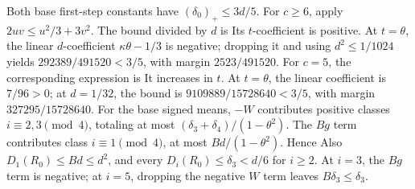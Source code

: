 Both base first-step constants have \((\delta_0)_+\le\allowbreak 3d/5\).
For \(c\ge\allowbreak 6\), apply \(2uv\le\allowbreak  u^2/3+3v^2\). The bound divided by
\(d\) is
Its \(t\)-coefficient is positive. At \(t=\allowbreak \theta\), the linear
\(d\)-coefficient \(\kappa\theta-1/3\) is negative; dropping it and
using \(d^2\le\allowbreak 1/1024\) yields \(292389/491520<\allowbreak 3/5\), with margin
\(2523/491520\).
For \(c=\allowbreak 5\), the corresponding expression is
It increases in \(t\). At \(t=\allowbreak \theta\), the linear coefficient is
\(7/96>\allowbreak 0\); at \(d=\allowbreak 1/32\), the bound is
\(9109889/15728640<\allowbreak 3/5\), with margin \(327295/15728640\).
For the base signed means, \(-W\) contributes positive classes
\(i\equiv2,\allowbreak 3\pmod4\), totaling at most
\((\delta_3+\delta_4)/(1-\theta^2)\).
The \(Bg\) term contributes class \(i\equiv1\pmod4\), at most
\(Bd/(1-\theta^2)\). Hence
Also \(D_1(R_0)\le\allowbreak  Bd\le\allowbreak  d^2\), and every
\(D_i(R_0)\le\allowbreak \delta_3<\allowbreak d/6\) for \(i\ge\allowbreak 2\).
At \(i=\allowbreak 3\), the \(Bg\) term is negative; at \(i=\allowbreak 5\), dropping the
negative \(W\) term leaves \(B\delta_3\le\allowbreak \delta_3\).

